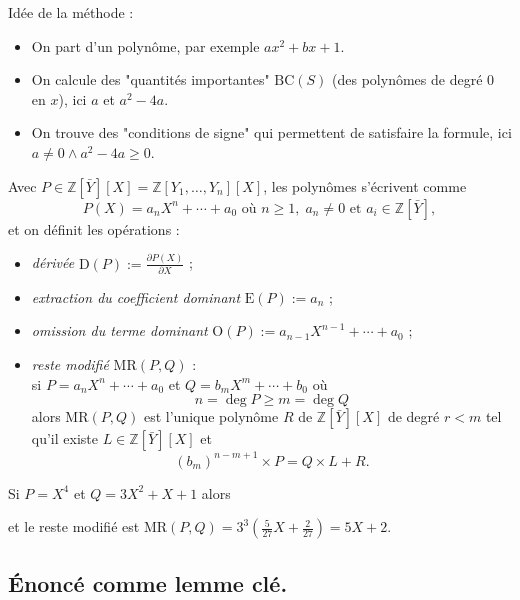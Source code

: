 \documentclass[./main]{subfiles}
\begin{document}
  Idée de la méthode :
  \begin{itemize}
    \item On part d'un polynôme, par exemple $a x^2 + b x + 1$.
    \item On calcule des "quantités importantes" $\mathrm{BC}(S)$ (des polynômes de degré $0$ en $x$), ici $a$ et $a^2 - 4a$.
    \item On trouve des "conditions de signe" qui permettent de satisfaire la formule, ici $a \neq 0 \land a^2 - 4a \ge 0$.
  \end{itemize}

  \begin{defn}
    Avec $P \in \mathds{Z}[\bar{Y}][X] = \mathds{Z}[Y_1, \ldots, Y_n][X]$, les polynômes s'écrivent comme \[
      P(X) = a_n X^n + \cdots + a_0 \text{ où } n \ge 1, \; a_n \neq 0 \text{ et } a_i  \in \mathds{Z}[\bar{Y}]
    ,\]
    et on définit les opérations :
    \begin{itemize}
      \item \textit{dérivée} $\mathrm{D}(P) := \frac{\partial P(X)}{\partial X}$ ;
      \item \textit{extraction du coefficient dominant} $\mathrm{E}(P) := a_n$ ;
      \item \textit{omission du terme dominant} $\mathrm{O}(P) := a_{n-1} X^{n-1} + \cdots + a_0$ ;
      \item \textit{reste modifié} $\mathrm{MR}(P, Q)$ :\\
        si $P = a_n X^n + \cdots + a_0$ et $Q = b_m X^m + \cdots + b_0$ où
        \[ n = \deg P \ge m = \deg Q\]
        alors $\mathrm{MR}(P, Q)$ est l'unique polynôme $R$ de $\mathds{Z}[\bar{Y}][X]$ de degré $r < m$ tel qu'il existe $L \in \mathds{Z}[\bar{Y}][X]$ et 
        \[
          (b_m)^{n - m + 1} \times P = Q \times L + R
        .\]
    \end{itemize}
  \end{defn}

  \begin{exm}
    Si $P = X^4$ et $Q = 3X^2 + X + 1$ alors 
    \begin{center}
    \end{center}
    et le reste modifié est $\mathrm{MR}(P, Q) = 3^3(\frac{5}{27} X + \frac{2}{27}) = 5X + 2$.
  \end{exm}

  \subsection{Énoncé comme lemme clé.}
\end{document}
